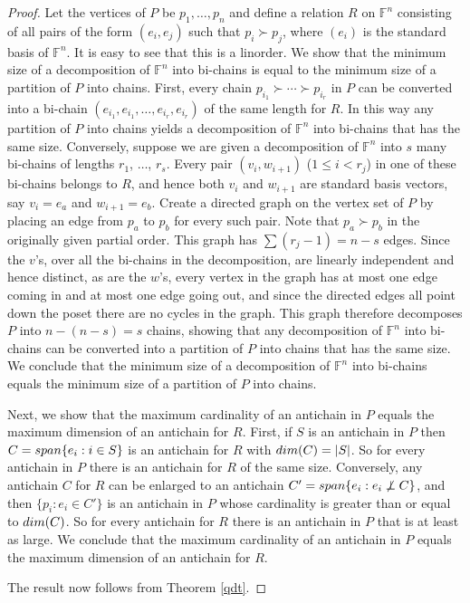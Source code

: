 \documentclass[10pt,a4paper]{amsart}
\begin{document}
\begin{proof}
Let the vertices of $P$ be $p_1, \ldots, p_n$ and define a relation $R$ on $\mathbb{F}^n$ consisting of all pairs of the form $(e_i, e_j)$ such that $p_i \succ p_j$, where $(e_i)$ is the standard basis of $\mathbb{F}^n$. It is easy to see that this is a linorder. We show that the minimum size of a decomposition of $\mathbb{F}^n$ into bi-chains is equal to the minimum size of a partition of $P$ into chains. First, every chain $p_{i_1} \succ \cdots \succ p_{i_r}$ in $P$ can be converted into a bi-chain $(e_{i_1}, e_{i_1}, \ldots, e_{i_r}, e_{i_r})$ of the same length for $R$. In this way any partition of $P$ into chains yields a decomposition of $\mathbb{F}^n$ into bi-chains that has the same size. Conversely, suppose we are given a decomposition of $\mathbb{F}^n$ into $s$ many bi-chains of lengths $r_1$, $\ldots$, $r_s$. Every pair $(v_i, w_{i+1})$ ($1 \leq i < r_j$) in one of these bi-chains belongs to $R$, and hence both $v_i$ and $w_{i+1}$ are standard basis vectors, say $v_i = e_a$ and $w_{i+1} = e_b$. Create a directed graph on the vertex set of $P$ by placing an edge from $p_a$ to $p_b$ for every such pair. Note that $p_a \succ p_b$ in the originally given partial order. This graph has $\sum (r_j - 1) = n - s$ edges. Since the $v$'s, over all the bi-chains in the decomposition, are linearly independent and hence distinct, as are the $w$'s, every vertex in the graph has at most one edge coming in and at most one edge going out, and since the directed edges all point down the poset there are no cycles in the graph. This graph therefore decomposes $P$ into $n - (n - s) = s$ chains, showing that any decomposition of $\mathbb{F}^n$ into bi-chains can be converted into a partition of $P$ into chains that has the same size. We conclude that the minimum size of a decomposition of $\mathbb{F}^n$ into bi-chains equals the minimum size of a partition of $P$ into chains.

Next, we show that the maximum cardinality of an antichain in $P$ equals the maximum dimension of an antichain for $R$. First, if $S$ is an antichain in $P$ then $C = {\rm span}\{e_i: i \in S\}$ is an antichain for $R$ with ${\rm dim}(C) = |S|$. So for every antichain in $P$ there is an antichain for $R$ of the same size. Conversely, any antichain $C$ for $R$ can be enlarged to an antichain $C' = {\rm span}\{e_i: e_i \not\perp C\}$, and then $\{p_i: e_i \in C'\}$ is an antichain in $P$ whose cardinality is greater than or equal to ${\rm dim}(C)$. So for every antichain for $R$ there is an antichain in $P$ that is at least as large. We conclude that the maximum cardinality of an antichain in $P$ equals the maximum dimension of an antichain for $R$.

The result now follows from Theorem \ref{qdt}.
\end{proof}
\end{document}
